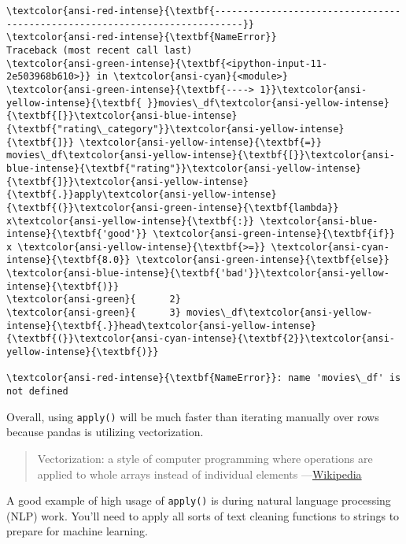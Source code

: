 \documentclass[11pt]{article}
\begin{document}
    \begin{Verbatim}[commandchars=\\\{\}, frame=single, framerule=2mm, rulecolor=\color{outerrorbackground}]
\textcolor{ansi-red-intense}{\textbf{---------------------------------------------------------------------------}}
\textcolor{ansi-red-intense}{\textbf{NameError}}                                 Traceback (most recent call last)
\textcolor{ansi-green-intense}{\textbf{<ipython-input-11-2e503968b610>}} in \textcolor{ansi-cyan}{<module>}
\textcolor{ansi-green-intense}{\textbf{----> 1}}\textcolor{ansi-yellow-intense}{\textbf{ }}movies\_df\textcolor{ansi-yellow-intense}{\textbf{[}}\textcolor{ansi-blue-intense}{\textbf{"rating\_category"}}\textcolor{ansi-yellow-intense}{\textbf{]}} \textcolor{ansi-yellow-intense}{\textbf{=}} movies\_df\textcolor{ansi-yellow-intense}{\textbf{[}}\textcolor{ansi-blue-intense}{\textbf{"rating"}}\textcolor{ansi-yellow-intense}{\textbf{]}}\textcolor{ansi-yellow-intense}{\textbf{.}}apply\textcolor{ansi-yellow-intense}{\textbf{(}}\textcolor{ansi-green-intense}{\textbf{lambda}} x\textcolor{ansi-yellow-intense}{\textbf{:}} \textcolor{ansi-blue-intense}{\textbf{'good'}} \textcolor{ansi-green-intense}{\textbf{if}} x \textcolor{ansi-yellow-intense}{\textbf{>=}} \textcolor{ansi-cyan-intense}{\textbf{8.0}} \textcolor{ansi-green-intense}{\textbf{else}} \textcolor{ansi-blue-intense}{\textbf{'bad'}}\textcolor{ansi-yellow-intense}{\textbf{)}}
\textcolor{ansi-green}{      2} 
\textcolor{ansi-green}{      3} movies\_df\textcolor{ansi-yellow-intense}{\textbf{.}}head\textcolor{ansi-yellow-intense}{\textbf{(}}\textcolor{ansi-cyan-intense}{\textbf{2}}\textcolor{ansi-yellow-intense}{\textbf{)}}

\textcolor{ansi-red-intense}{\textbf{NameError}}: name 'movies\_df' is not defined
    \end{Verbatim}

    Overall, using \texttt{apply()} will be much faster than iterating
manually over rows because pandas is utilizing vectorization.

\begin{quote}
Vectorization: a style of computer programming where operations are
applied to whole arrays instead of individual elements
---\href{https://en.wikipedia.org/wiki/Vectorization}{Wikipedia}
\end{quote}

A good example of high usage of \texttt{apply()} is during natural
language processing (NLP) work. You'll need to apply all sorts of text
cleaning functions to strings to prepare for machine learning.
\end{document}
